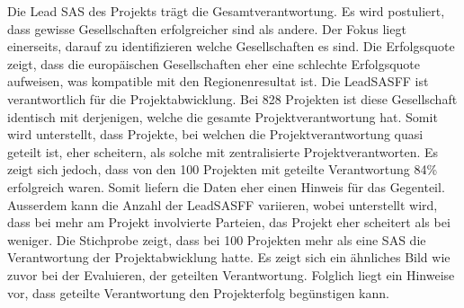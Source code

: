 \newline Die Lead SAS des Projekts trägt die Gesamtverantwortung. Es wird postuliert, dass gewisse Gesellschaften erfolgreicher sind als andere. Der Fokus liegt einerseits, darauf zu identifizieren welche Gesellschaften es sind. Die Erfolgsquote zeigt, dass die europäischen Gesellschaften eher eine schlechte Erfolgsquote aufweisen, was kompatible mit den Regionenresultat ist. Die LeadSASFF ist verantwortlich für die Projektabwicklung. Bei 828 Projekten ist diese Gesellschaft identisch mit derjenigen, welche die gesamte Projektverantwortung hat. Somit wird unterstellt, dass Projekte, bei welchen die Projektverantwortung quasi geteilt ist, eher scheitern, als solche mit zentralisierte Projektverantworten. Es zeigt sich jedoch, dass von den 100 Projekten mit geteilte Verantwortung 84\% erfolgreich waren. Somit liefern die Daten eher einen Hinweis für das Gegenteil. Ausserdem kann die Anzahl der LeadSASFF variieren, wobei unterstellt wird, dass bei mehr am Projekt involvierte Parteien, das Projekt eher scheitert als bei weniger. Die Stichprobe zeigt, dass bei 100 Projekten mehr als eine SAS die Verantwortung der Projektabwicklung hatte. Es zeigt sich ein ähnliches Bild wie zuvor bei der Evaluieren, der geteilten Verantwortung. Folglich liegt ein Hinweise vor, dass geteilte Verantwortung den Projekterfolg begünstigen kann. 
